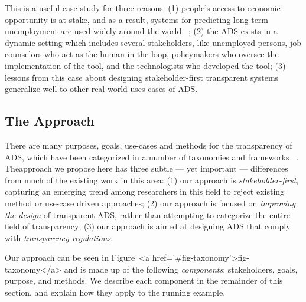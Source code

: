 This is a useful case study for three reasons: (1) people's access to economic opportunity is at stake, and as a result, systems for predicting long-term unemployment are used widely around the world ~\cite{platform2018tackling, sztandar2018changing, loxha2014profiling, matty2013predicting, riipinen2011risk, caswell2010unemployed}; (2) the ADS exists in a dynamic setting which includes several stakeholders, like unemployed persons, job counselors who act as the human-in-the-loop, policymakers who oversee the implementation of the tool, and the technologists who developed the tool; (3) lessons from this case about designing stakeholder-first transparent systems generalize well to other real-world uses cases of ADS.

\subsection{The Approach}
\label{sec:approach}

There are many purposes, goals, use-cases and methods for the transparency of ADS, which have been categorized in a number of taxonomies and frameworks ~\cite{DBLP:journals/jmlr/AryaBCDHHHLLMMP20, ventocilla2018towards, DBLP:journals/corr/abs-2012-01805, molnar2019, meske, DBLP:conf/chi/LiaoGM20, rodolfa2020machine, richards2021human, DBLP:journals/corr/abs-2001-09734}. Theapproach we propose here has three subtle --- yet important --- differences from much of the existing work in this area: (1) our approach is \emph{stakeholder-first}, capturing an emerging trend among researchers in this field to reject existing method or use-case driven approaches; (2) our approach is focused on \emph{improving the design} of transparent ADS, rather than attempting to categorize the entire field of transparency; (3) our approach is aimed at designing ADS that comply with \emph{transparency regulations}.

Our approach can be seen in Figure~<a href='#fig-taxonomy'>fig-taxonomy</a> and is made up of the following \emph{components}: stakeholders, goals, purpose, and methods. We describe each component in the remainder of this section, and explain how they apply to the running example.

